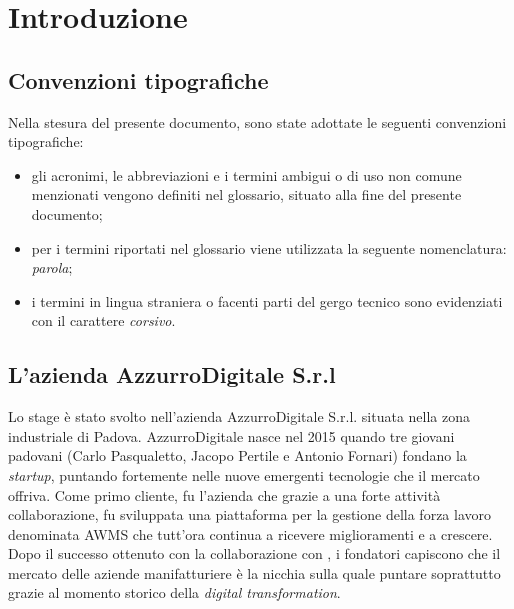 
\chapter{Introduzione}
\label{cap:introduzione}

\section{Convenzioni tipografiche}
Nella stesura del presente documento, sono state adottate le seguenti convenzioni tipografiche:
\begin{itemize}
	\item gli acronimi, le abbreviazioni e i termini ambigui o di uso non comune menzionati vengono definiti nel glossario, situato alla fine del presente documento;
	\item per i termini riportati nel glossario viene utilizzata la seguente nomenclatura: \emph{parola}\textcolor{SchoolColor}{\ap{[g]}};
	\item i termini in lingua straniera o facenti parti del gergo tecnico sono evidenziati con il carattere \emph{corsivo}.
\end{itemize}

\section{L'azienda AzzurroDigitale S.r.l}

Lo stage è stato svolto nell'azienda AzzurroDigitale S.r.l. situata nella zona industriale di Padova. AzzurroDigitale nasce nel 2015 quando tre giovani padovani (Carlo Pasqualetto, Jacopo Pertile e Antonio Fornari) fondano la \emph{startup}, puntando fortemente nelle nuove emergenti tecnologie che il mercato offriva. Come primo cliente, fu l'azienda  che grazie a una forte attività collaborazione, fu sviluppata una piattaforma per la gestione della forza lavoro denominata \gls{AWMS} che tutt’ora continua a ricevere miglioramenti e a crescere. Dopo il successo ottenuto con la collaborazione con , i fondatori capiscono che il mercato delle aziende manifatturiere è la nicchia sulla quale puntare soprattutto grazie al momento storico della \emph{digital transformation}. 

